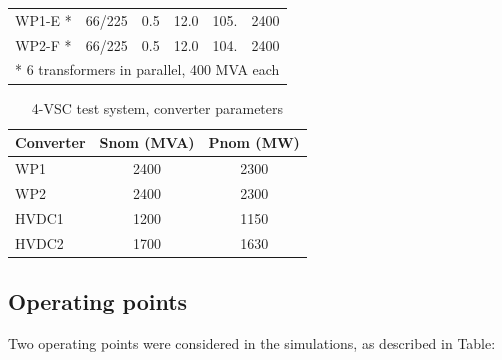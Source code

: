 \documentclass{report}
\begin{document}
\begin{table}[H]
\begin{tabular}{cccccc}
\multicolumn{1}{c|}{WP1-E *}    & \multicolumn{1}{c|}{66/225}                                                     & \multicolumn{1}{c|}{0.5}                                              & \multicolumn{1}{c|}{12.0}                                             & \multicolumn{1}{c|}{105.}                                                         & 2400                                                 \\
\multicolumn{1}{c|}{WP2-F *}    & \multicolumn{1}{c|}{66/225}                                                     & \multicolumn{1}{c|}{0.5}                                              & \multicolumn{1}{c|}{12.0}                                             & \multicolumn{1}{c|}{104.}                                                         & 2400                                                 \\
\multicolumn{6}{l}{* 6 transformers in parallel, 400 MVA each}                                                                                                                                                                                                                                                                                                                                              
\end{tabular}
\end{table}

\begin{table}[H]
\centering
\caption{4-VSC test system, converter parameters}
\label{4-VSC_conv_params}
\begin{tabular}{l|c|c}
\multicolumn{1}{c|}{Converter} & Snom (MVA) & Pnom (MW) \\ \hline
WP1                            & 2400       & 2300      \\
WP2                            & 2400       & 2300      \\
HVDC1                          & 1200       & 1150      \\
HVDC2                          & 1700       & 1630     
\end{tabular}
\end{table}

\subsection{Operating points}
Two operating points were considered in the simulations, as described in Table:
\end{document}
